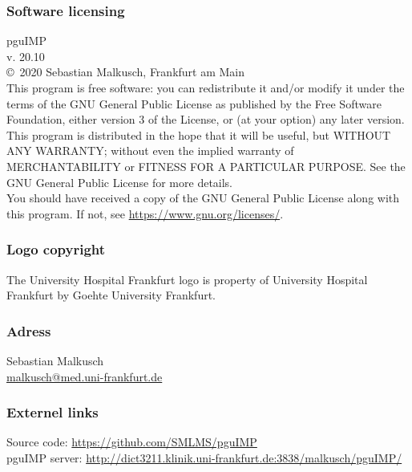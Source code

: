 {
  \thispagestyle{empty}
  
  \footnotesize
   \setlength{\parindent}{0pt}
   \setlength{\parskip}{\baselineskip}
   
   \vspace*{\fill}
   
   
   \subsubsection*{Software licensing}
   pguIMP\\
 
   v. 20.10\\
   \copyright\ 2020 Sebastian Malkusch, Frankfurt am Main\\
   This program is free software: you can redistribute it and/or modify it under the terms of the GNU General Public License as published by the Free Software Foundation, either version 3 of the License, or (at your option) any later version.\\This program is distributed in the hope that it will be useful, but WITHOUT ANY WARRANTY; without even the implied warranty of MERCHANTABILITY or FITNESS FOR A PARTICULAR PURPOSE.  See the GNU General Public License for more details.\\You should have received a copy of the GNU General Public License along with this program. If not, see \href{https://www.gnu.org/licenses/}{https://www.gnu.org/licenses/}.
   
   \subsubsection*{Logo copyright}
   The University Hospital Frankfurt logo is property of University Hospital Frankfurt by Goehte University Frankfurt. 
   
   \subsubsection*{Adress}
   Sebastian Malkusch\\
   \href{malkusch@med.uni-frankfurt.de}{malkusch@med.uni-frankfurt.de}
   
   \subsubsection*{Externel links}
   Source code: \href{https://github.com/SMLMS/pguIMP}{https://github.com/SMLMS/pguIMP}\\
   pguIMP server: \href{http://dict3211.klinik.uni-frankfurt.de:3838/malkusch/pguIMP/}{http://dict3211.klinik.uni-frankfurt.de:3838/malkusch/pguIMP/}
   \pagebreak{}
}